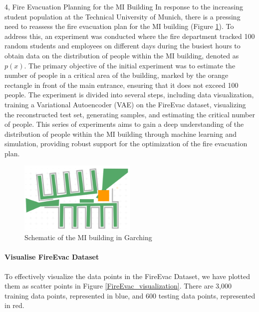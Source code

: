 \begin{task}{4, Fire Evacuation Planning for the MI Building}
In response to the increasing student population at the Technical University of Munich, there is a pressing need to reassess the fire evacuation plan for the MI building (Figure \ref{MI-building}). To address this, an experiment was conducted where the fire department tracked 100 random students and employees on different days during the busiest hours to obtain data on the distribution of people within the MI building, denoted as \(p(x)\). The primary objective of the initial experiment was to estimate the number of people in a critical area of the building, marked by the orange rectangle in front of the main entrance, ensuring that it does not exceed 100 people. The experiment is divided into several steps, including data visualization, training a Variational Autoencoder (VAE) on the FireEvac dataset, visualizing the reconstructed test set, generating samples, and estimating the critical number of people. This series of experiments aims to gain a deep understanding of the distribution of people within the MI building through machine learning and simulation, providing robust support for the optimization of the fire evacuation plan.

\begin{figure}[H]
\centering
\includegraphics[width=0.5\textwidth]{images/MI_building.png}
\caption{Schematic of the MI building in Garching}
\label{MI-building}
\end{figure}


\paragraph{Visualise FireEvac Dataset}
To effectively visualize the data points in the FireEvac Dataset, we have plotted them as scatter points in Figure \ref{FireEvac_visualization}. There are 3,000 training data points, represented in blue, and 600 testing data points, represented in red.


\end{task}
